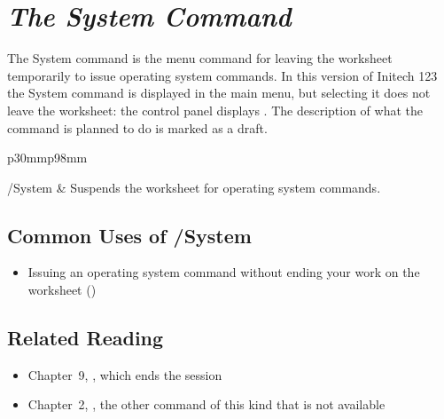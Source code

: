 
\chapter[The System Command]{\textit{The System Command}}


The System command is the menu command for leaving the worksheet temporarily to issue operating system commands.  In this version of Initech 123 the System command is displayed in the main menu, but selecting it does not leave the worksheet: the control panel displays .  The description of what the command is planned to do is marked as a draft.

\begin{LotTable}{p{30mm}p{98mm}}

/System & Suspends the worksheet for operating system commands. \LotEnd
\end{LotTable}

\section{Common Uses of /System}
\begin{itemize}
\item Issuing an operating system command without ending your work on the worksheet () 
\end{itemize}

\section{Related Reading}
\begin{itemize}
\item Chapter~9, , which ends the session
\item Chapter~2, , the other command of this kind that is not available
\end{itemize}

